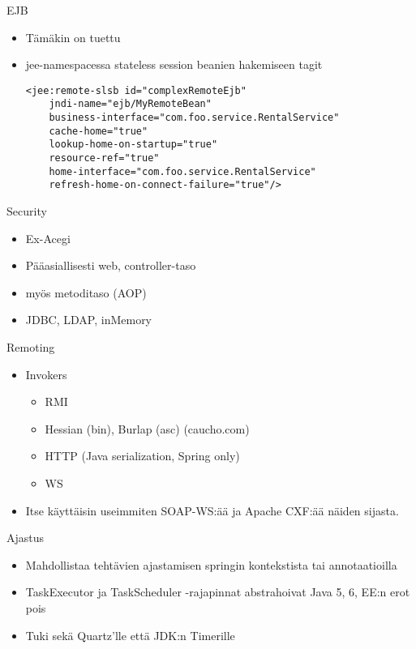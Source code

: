 \documentclass[hyperref={pdfauthor=\AUTHOR},14pt]{beamer}
\begin{document}
\begin{frame}[t, fragile]{EJB}
\begin{itemize}
\item Tämäkin on tuettu
\item jee-namespacessa stateless session beanien hakemiseen tagit
\begin{lstlisting}
<jee:remote-slsb id="complexRemoteEjb"
    jndi-name="ejb/MyRemoteBean"
    business-interface="com.foo.service.RentalService"
    cache-home="true"
    lookup-home-on-startup="true"
    resource-ref="true"
    home-interface="com.foo.service.RentalService"
    refresh-home-on-connect-failure="true"/>
\end{lstlisting}
\end{itemize}
\end{frame}

\begin{frame}{Security}
\begin{itemize}
\item Ex-Acegi
\item Pääasiallisesti web, controller-taso
\item myös metoditaso (AOP)
\item JDBC, LDAP, inMemory
\end{itemize}
\end{frame}

\begin{frame}{Remoting}
\begin{itemize}
\item Invokers
\begin{itemize}
\item RMI
\item Hessian (bin), Burlap (asc) (caucho.com)
\item HTTP (Java serialization, Spring only)
\item WS
\end{itemize}
\item Itse käyttäisin useimmiten SOAP-WS:ää ja Apache CXF:ää näiden
  sijasta.
\end{itemize}
\end{frame}

\begin{frame}{Ajastus}
\begin{itemize}
\item Mahdollistaa tehtävien ajastamisen springin kontekstista tai
  annotaatioilla
\item TaskExecutor ja TaskScheduler -rajapinnat abstrahoivat Java 5,
  6, EE:n erot pois
\item Tuki sekä Quartz'lle että JDK:n Timerille
\end{itemize}
\end{frame}
\end{document}
